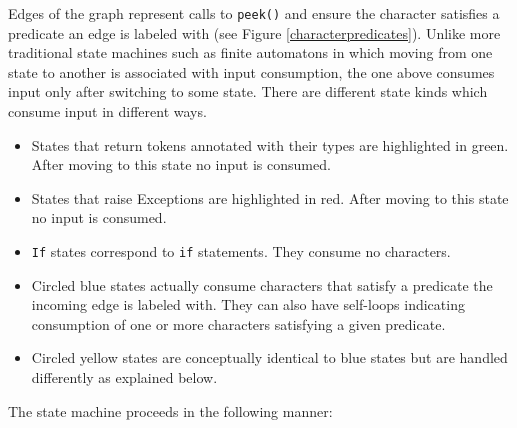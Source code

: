 \begin{itemize}
Edges of the graph represent calls to \texttt{peek()} and ensure the character satisfies a predicate an edge is labeled with (see Figure \ref{characterpredicates}). Unlike more traditional state machines such as finite automatons in which moving from one state to another is associated with input consumption, the one above consumes input only after switching to some state. There are different state kinds which consume input in different ways.
\begin{itemize}
\item States that return tokens annotated with their types are highlighted in green. After moving to this state no input is consumed.
\item States that raise Exceptions are highlighted in red. After moving to this state no input is consumed.
\item \texttt{If} states correspond to \texttt{if} statements. They consume no characters.
\item Circled blue states actually consume characters that satisfy a predicate the incoming edge is labeled with. They can also have self-loops indicating consumption of one or more characters satisfying a given predicate.
\item Circled yellow states are conceptually identical to blue states but are handled differently as explained below.
\end{itemize}

The state machine proceeds in the following manner:


\end{itemize}
